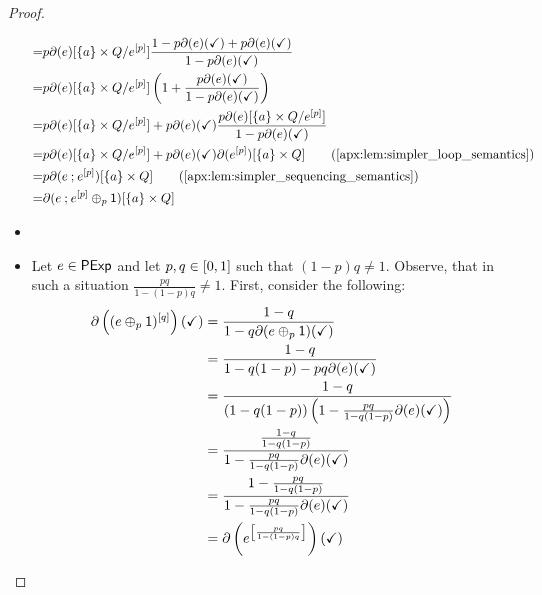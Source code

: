 \begin{proof}
\begin{itemize}[leftmargin=0em]
\begin{align*}
            =& p\partial(e)[\{a\} \times {Q}/{e^{[p]}}]\frac{1-p\partial(e)(\checkmark) + p\partial(e)(\checkmark)}{1-p\partial(e)(\checkmark)}\\
            =& p \partial(e)[\{a\} \times Q/{e^{[p]}}] \left( 1 + \frac{p\partial(e)(\checkmark)}{1-p\partial(e)(\checkmark)}\right)\\
            =& p \partial(e)[\{a\} \times Q/{e^{[p]}}] + p\partial(e)(\checkmark)\frac{p\partial(e)[\{a\} \times {Q}/{e^{[p]}}]}{1-p\partial(e)(\checkmark)}\\
            =& p \partial(e)[\{a\} \times Q/{e^{[p]}}] + p\partial(e)(\checkmark)\partial(e^{[p]})[\{a\} \times Q] \tag{\Cref{apx:lem:simpler_loop_semantics}}\\
            =& p \partial(e \seq e^{[p]})[\{a\} \times Q]\tag{\Cref{apx:lem:simpler_sequencing_semantics}}\\
            =& \partial(e \seq e^{[p]} \oplus_p \one)[\{a\} \times Q]
        \end{align*}

        \item[] 
        \item[] Let $e \in \mathsf{PExp}$ and let $p,q \in \interval{0}{1}$ such that $(1-p)q \neq 1$. Observe, that in such a situation $\frac{pq}{1-(1-p)q}\neq 1$.
        First, consider the following:
        \begin{align*}
            \partial\left((e \oplus_p \mathsf{1})^{[q]}\right)(\checkmark) &= \frac{1-q}{1-q\partial(e \oplus_p \mathsf{1})(\checkmark)} \\
            &= \frac{1-q}{1-q(1-p)-pq\partial(e)(\checkmark)} \\
            &= \frac{1-q}{(1-q(1-p))\left(1-\frac{pq}{1-q(1-p)}\partial(e)(\checkmark)\right)}\\
            &=\frac{\frac{1-q}{1-q(1-p)}}{1-\frac{pq}{1-q(1-p)}\partial(e)(\checkmark)}\\
            &=\frac{1-\frac{pq}{1-q(1-p)}}{1-\frac{pq}{1-q(1-p)}\partial(e)(\checkmark)}\\
            &=\partial \left(e^{\left[\frac{pq}{1-(1-p)q}\right]}\right)(\checkmark)
        \end{align*}


\end{itemize}
\end{proof}
